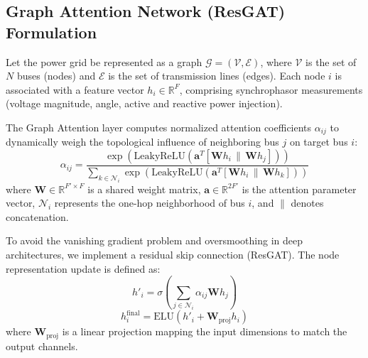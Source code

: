 \documentclass[10pt, a4paper, twocolumn]{article}
\begin{document}
\subsection{Graph Attention Network (ResGAT) Formulation}
Let the power grid be represented as a graph $\mathcal{G} = (\mathcal{V}, \mathcal{E})$, where $\mathcal{V}$ is the set of $N$ buses (nodes) and $\mathcal{E}$ is the set of transmission lines (edges). Each node $i$ is associated with a feature vector $h_i \in \mathbb{R}^F$, comprising synchrophasor measurements (voltage magnitude, angle, active and reactive power injection).

The Graph Attention layer computes normalized attention coefficients $\alpha_{ij}$ to dynamically weigh the topological influence of neighboring bus $j$ on target bus $i$:
\begin{equation}
\alpha_{ij} = \frac{\exp\left(\text{LeakyReLU}\left(\mathbf{a}^T [\mathbf{W}h_i \,\|\, \mathbf{W}h_j]\right)\right)}{\sum_{k \in \mathcal{N}_i} \exp\left(\text{LeakyReLU}\left(\mathbf{a}^T [\mathbf{W}h_i \,\|\, \mathbf{W}h_k]\right)\right)}
\end{equation}
where $\mathbf{W} \in \mathbb{R}^{F' \times F}$ is a shared weight matrix, $\mathbf{a} \in \mathbb{R}^{2F'}$ is the attention parameter vector, $\mathcal{N}_i$ represents the one-hop neighborhood of bus $i$, and $\|$ denotes concatenation. 

To avoid the vanishing gradient problem and oversmoothing in deep architectures, we implement a residual skip connection (ResGAT). The node representation update is defined as:
\begin{equation}
h'_i = \sigma \left( \sum_{j \in \mathcal{N}_i} \alpha_{ij} \mathbf{W}h_j \right)
\end{equation}
\begin{equation}
h^{\text{final}}_i = \text{ELU}\left(h'_i + \mathbf{W}_{\text{proj}} h_i\right)
\end{equation}
where $\mathbf{W}_{\text{proj}}$ is a linear projection mapping the input dimensions to match the output channels.
\end{document}
